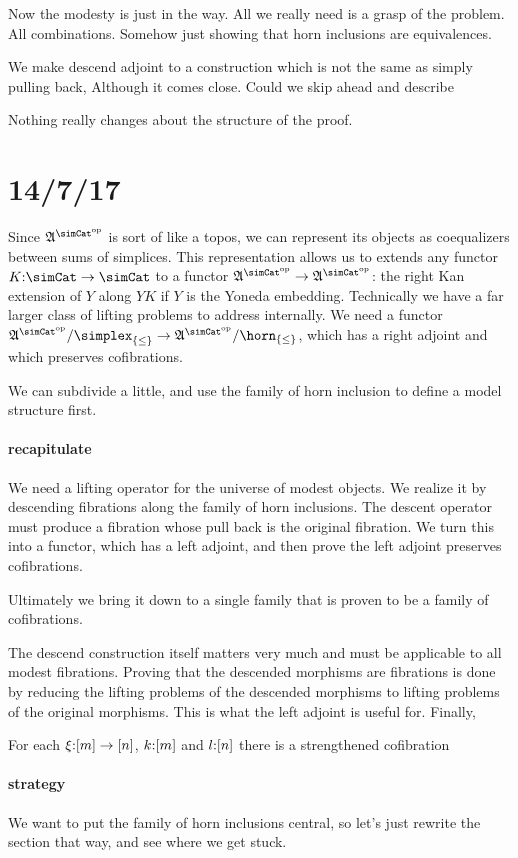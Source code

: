 \documentclass[csh.tex]{subfiles}
\begin{document}
Now the modesty is just in the way. All we really need is a grasp of the problem. 
All combinations.
Somehow just showing that horn inclusions are equivalences.

We make descend adjoint to a construction which is not the same as simply pulling back,
Although it comes close. Could we skip ahead and describe 

Nothing really changes about the structure of the proof.

\section{14/7/17}
Since $\ambient\s$ is sort of like a topos, we can represent its objects as coequalizers between sums of simplices. This representation allows us to extends any functor $K\of \simCat \to \simCat$ to a functor $\ambient\s\to\ambient\s$: the right Kan extension of $Y$ along $YK$ if $Y$ is the Yoneda embedding.
Technically we have a far larger class of lifting problems to address internally. We need a functor $\ambient\s/\simplex_{\set\leq}\to\ambient\s/\horn_{\set\leq}$, which has a right adjoint and which preserves cofibrations.

We can subdivide a little, and use the family of horn inclusion to define a model structure first.

\paragraph{recapitulate}
We need a lifting operator for the universe of modest objects. We realize it by descending fibrations along the family of horn inclusions. The descent operator must produce a fibration whose pull back is the original fibration. We turn this into a functor, which has a left adjoint, and then prove the left adjoint preserves cofibrations.

Ultimately we bring it down to a single family that is proven to be a family of cofibrations.

The descend construction itself matters very much and must be applicable to all modest fibrations.
Proving that the descended morphisms are fibrations is done by reducing the lifting problems of the descended morphisms to lifting problems of the original morphisms. This is what the left adjoint is useful for. Finally, 


For each $\xi\mathord : [m]\to[n]$, $k\mathord :[m]$ and $l\mathord :[n]$ there is a strengthened cofibration 

\paragraph{strategy}
We want to put the family of horn inclusions central, so let's just rewrite the section that way, and see where we get stuck.
\end{document}
